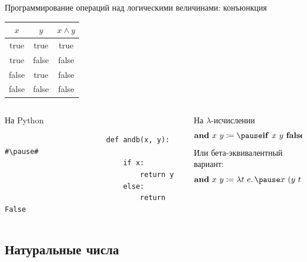     \begin{frame}[fragile]{Программирование операций над логическими величинами: конъюнкция}
        \begin{center}
            \begin{tabular}{|c|c|c|}
                \hline
                $x$   & $y$   & $x \land y$ \\ \hline
                true  & true  & true        \\
                true  & false & false       \\
                false & true  & false       \\
                false & false & false       \\ \hline
            \end{tabular}
        \end{center}
        \begin{columns}[onlytextwidth]
            \begin{column}[t]{0.485\textwidth}
                \begin{block}{На Python}
                    \begin{verbatim}
                        def andb(x, y): #\pause#
                            if x:
                                return y
                            else:
                                return False
                    \end{verbatim}
                \end{block}
            \end{column}\hfill
            \pause%
            \begin{column}[t]{0.485\textwidth}
                \begin{block}{На $\lambda$-исчислении}
                    \[
                        \term{and} ~x~y \termdef \pause \term{if} \ap x \ap y \ap \term{false}
                    \]
                    \pause
                    Или бета-эквивалентный вариант:
                    \[\term{and}~x~y \termdef \lambda t~e\ldotp \pause x~(y~t~e)~e\]
                    \vspace{-1em}
                \end{block}
            \end{column}
        \end{columns}
    \end{frame}

    \subsection{Натуральные числа}

